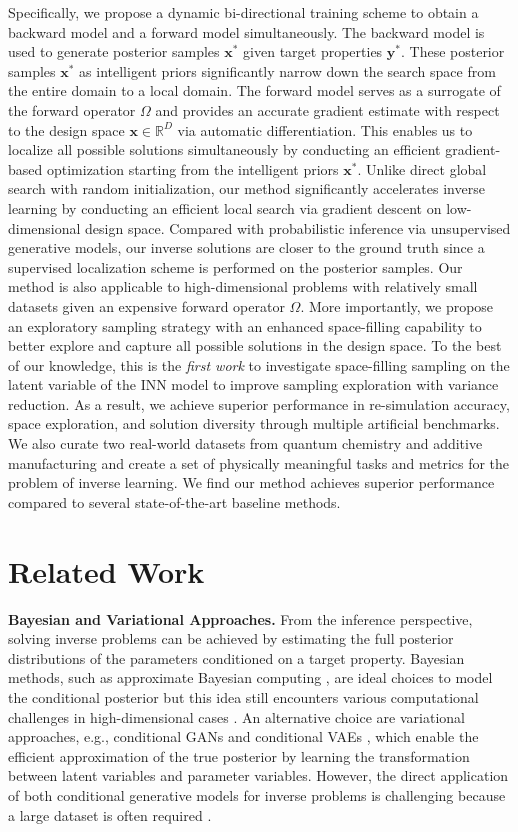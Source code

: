 \documentclass[letterpaper]{article}
\begin{document}
Specifically, we propose a dynamic bi-directional training scheme to obtain a backward model and a forward model simultaneously. The backward model is used to generate posterior samples $\mathbf{x}^*$ given target properties $\mathbf{y}^*$. These posterior samples $\mathbf{x}^*$ as intelligent priors significantly narrow down the search space from the entire domain to a local domain. The forward model serves as a surrogate of the forward operator $\Omega$ and provides an accurate gradient estimate with respect to the design space $\mathbf{x} \in \mathbb{R}^D$ via automatic differentiation. This enables us to localize all possible solutions simultaneously by conducting an efficient gradient-based optimization starting from the intelligent priors $\mathbf{x}^*$. Unlike direct global search with random initialization, our method significantly accelerates inverse learning by conducting an efficient local search via gradient descent on low-dimensional design space. Compared with probabilistic inference via unsupervised generative models, our inverse solutions are closer to the ground truth since a supervised localization scheme is performed on the posterior samples. Our method is also applicable to high-dimensional problems with relatively small datasets given an expensive forward operator $\Omega$. More importantly, we propose an exploratory sampling strategy with an enhanced space-filling capability to better explore and capture all possible solutions in the design space. To the best of our knowledge, this is the \emph{first work} to investigate space-filling sampling on the latent variable of the INN model to improve sampling exploration with variance reduction. As a result, we achieve superior performance in re-simulation accuracy, space exploration, and solution diversity through multiple artificial benchmarks. We also curate two real-world datasets from quantum chemistry and additive manufacturing and create a set of physically meaningful tasks and metrics for the problem of inverse learning. We find our method achieves superior performance compared to several state-of-the-art baseline methods.

\section{Related Work}
{\bf Bayesian and Variational Approaches.}
From the inference perspective, solving inverse problems can be achieved by estimating the full posterior distributions of the parameters conditioned on a target property. Bayesian methods, such as approximate Bayesian computing \citep{yang2018predictive}, are ideal choices to model the conditional posterior but this idea still encounters various computational challenges in high-dimensional cases \cite{zhang2018effect,zhang2018quantification}. An alternative choice are variational approaches, e.g., conditional GANs \citep{wang2018high} and conditional VAEs \citep{sohn2015learning}, which enable the efficient approximation of the true posterior by learning the transformation between latent variables and parameter variables. However, the direct application of both conditional generative models for inverse problems is challenging because a large dataset is often required \citep{tonolini2020variational}.
\end{document}
